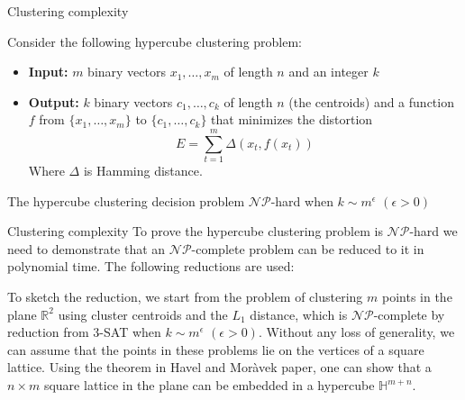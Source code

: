 \documentclass[9pt]{beamer}
\begin{document}
\begin{frame}{Clustering complexity}
    \begin{theorem}
        Consider the following hypercube clustering problem:
        \begin{itemize}
            \item \textbf{Input:} $m$ binary vectors $x_1, \dots, x_m$ of length $n$ and an integer $k$
            \item \textbf{Output:} $k$ binary vectors $c_1, \dots, c_k$ of length $n$ (the centroids) and a function $f$ from $\{x_1, \dots, x_m\}$ to $\{c_1, \dots, c_k\}$ that minimizes the distortion 
            \[
                E = \sum_{t=1}^m \Delta(x_t, f(x_t))    
            \]
            Where $\Delta$ is Hamming distance.
        \end{itemize}
        The hypercube clustering decision problem $\mathcal{NP}$-hard when $k \sim m^\epsilon$ $(\epsilon > 0)$
    \end{theorem}
\end{frame}



\begin{frame}{Clustering complexity}
To prove the hypercube clustering problem is $\mathcal{NP}$-hard we need to demonstrate that an $\mathcal{NP}$-complete problem can be reduced to it in polynomial time. The following reductions are used:
\begin{center}
\end{center}
\vspace{0.3cm}
To sketch the reduction, we start from the problem of clustering $m$ points in the plane $\mathbb{R}^2$ using cluster centroids and the $L_1$ distance, which is $\mathcal{NP}$-complete by reduction from 3-SAT when $k \sim m^\epsilon$ $(\epsilon > 0)$. Without any loss of generality, we can assume that the points in these problems lie on the vertices of a square lattice. Using the theorem in Havel and Moràvek paper, one can show that a $n \times m$ square lattice in the plane can be embedded in a hypercube $\mathbb{H}^{m+n}$.    
\end{frame}
\end{document}
